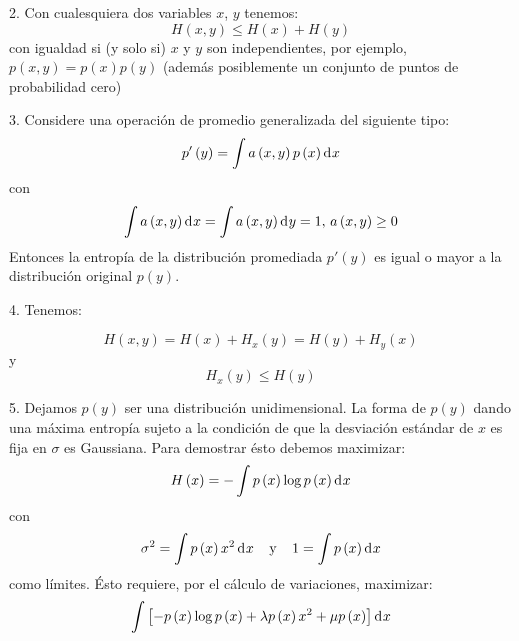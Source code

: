 2. Con cualesquiera dos variables $x$, $y$ tenemos:
\begin{equation}
H\left ( x,y \right )\leq H\left ( x \right )+H\left ( y \right )
\end{equation}
con igualdad si (y solo si) $x$ y $y$ son independientes, por ejemplo,
$p\left ( x,y \right )=p\left ( x \right )p\left ( y \right )$
(adem\'as posiblemente un conjunto de puntos de probabilidad cero)

3. Considere una operaci\'on de promedio generalizada del siguiente tipo:
\begin{equation}
{p}'\left ( y \right )=\int a\left ( x,y \right )p\left ( x \right ) \diff x 
\end{equation}
con
\begin{equation}
\int a\left ( x,y \right ) \diff x =\int a\left ( x,y \right ) \diff y =1, 
\,  a\left ( x,y \right )\geq 0
\end{equation}
Entonces la entrop\'ia de la distribuci\'on promediada ${p}'\left ( y
\right )$ es igual o mayor a la distribuci\'on original $p\left
( y \right )$. 

4. Tenemos:

\begin{equation}
H\left ( x,y \right )=H\left ( x \right )+H_{x}\left ( y \right )=H\left ( y \right )+H_{y}\left ( x \right )
\end{equation}
y
\begin{equation}
H_x{}\left ( y \right )\leq H\left ( y \right )
\end{equation}

5. Dejamos $p\left ( y \right )$ ser una distribuci\'on unidimensional. La forma de $p\left ( y \right )$ dando una m\'axima entrop\'ia sujeto a la condici\'on de que la desviaci\'on est\'andar de $x$ es fija en $\sigma $ es Gaussiana. Para demostrar \'esto debemos maximizar:
\begin{equation}
H\left ( x \right )=-\int p\left ( x \right )\log p\left ( x \right ) \diff x 
\end{equation}
con
\begin{equation}
\sigma^{2}=\int p\left ( x \right )x^{2} \diff x  \:\:\:\:\: \textup{y} \:\:\:\:\: 1=\int p\left ( x \right ) \diff x 
\end{equation}
como l\'imites. \'Esto requiere, por el c\'alculo de variaciones, maximizar:
\begin{equation}
\int \left [ -p\left ( x \right ) \log p\left ( x \right ) + \lambda p\left ( x \right ) x^{2} + \mu p\left ( x \right )\right ] \diff x 
\end{equation}

